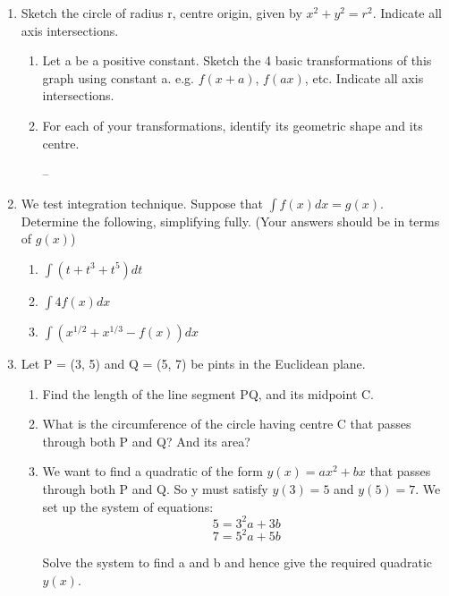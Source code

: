 \documentclass{article}
\begin{document}
\begin{enumerate}
	\item Sketch the circle of radius r, centre origin, given by $x^2 + y^2 = r^2$.  Indicate all axis intersections.
		\begin{enumerate}
			\item Let a be a positive constant.  Sketch the 4 basic transformations of this graph using constant a. e.g. $f(x+a)$, $f(ax)$, etc. Indicate all axis intersections.
			
			\item For each of your transformations, identify its geometric shape and its centre.
			
--
			
		\end{enumerate}


	\item We test integration technique. Suppose that $\int{f(x)}dx = g(x)$. \\
			Determine the following, simplifying fully. (Your answers should be in terms of $g(x)$)
		\begin{enumerate}
			\item $\int (t + t^3 + t^5)dt$
			
			\item $\int 4f(x)dx$
			
			\item $\int (x^{1/2} + x^{1/3} - f(x)) dx$
			
		\end{enumerate}


	
	
	\item Let P = (3, 5) and Q = (5, 7) be pints in the Euclidean plane.
	\begin{enumerate}
		\item Find the length of the line segment PQ, and its midpoint C.
		
		\item What is the circumference of the circle having centre C that passes through both P and Q?  And its area?
		
		\item We want to find a quadratic of the form $y(x) = ax^2 + bx$ that passes through both P and Q.  So y must satisfy $y(3) = 5$ and $y(5) = 7$.  We set up the system of equations:
		$$5 = 3^2a + 3b$$
		$$7 = 5^2a + 5b$$
		
		Solve the system to find a and b and hence give the required quadratic $y(x)$.
		
		
	\end{enumerate}
	
\end{enumerate}
\end{document}
